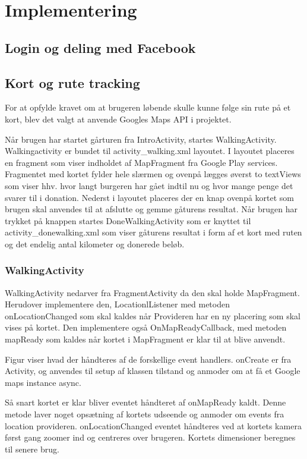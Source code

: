 \thispagestyle{fancy}
\chapter{Implementering}
\label{chp:Implementering}

\section{Login og deling med Facebook}

\section{Kort og rute tracking}
For at opfylde kravet om at brugeren løbende skulle kunne følge sin rute på et kort, blev det valgt at anvende Googles Maps API i projektet.

Når brugen har startet gårturen fra IntroActivity, startes WalkingActivity. Walkingactivity er bundet til activity\_walking.xml layoutet. I layoutet placeres en fragment som viser indholdet af MapFragment fra Google Play services. Fragmentet med kortet fylder hele slærmen og ovenpå lægges øverst to textViews som viser hhv. hvor langt burgeren har gået indtil nu og hvor mange penge det svarer til i donation.
Nederst i layoutet placeres der en knap ovenpå kortet som brugen skal anvendes til at afslutte og gemme gåturens resultat. Når brugen har trykket på knappen startes DoneWalkingActivity som er knyttet til activity\_donewalking.xml som viser gåturens resultat i form af et kort med ruten og det endelig antal kilometer og donerede beløb.

\subsection{WalkingActivity}

WalkingActivity nedarver fra FragmentActivity da den skal holde MapFragment. Herudover implementere den, LocationlListener med metoden onLocationChanged som skal kaldes når Provideren har en ny placering som skal vises på kortet. Den implementere også OnMapReadyCallback, med metoden mapReady som kaldes når kortet i MapFragment er klar til at blive anvendt.

Figur  viser hvad der håndteres af de forskellige event handlers. onCreate er fra Activity, og anvendes til setup af klassen tilstand og anmoder om at få et Google maps instance async.

Så snart kortet er klar bliver eventet håndteret af onMapReady kaldt. Denne metode laver noget opsætning af kortets udseende og anmoder om events fra location provideren. onLocationChanged eventet håndteres ved at kortets kamera først gang zoomer ind og centreres over brugeren. Kortets dimensioner beregnes til senere brug.

